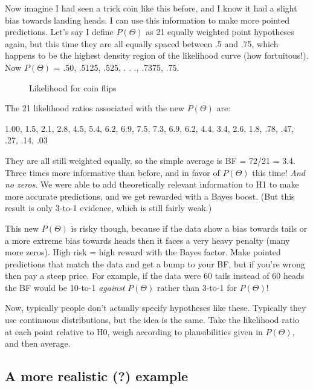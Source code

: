 Now imagine I had seen a trick coin like this before, and I know it had a slight bias towards landing heads. I can use this information to make more pointed predictions. Let's say I define $P(\Theta)$ as 21 equally weighted point hypotheses again, but this time they are all equally spaced between .5 and .75, which happens to be the highest density region of the likelihood curve (how fortuitous!). Now $P(\Theta)$ = {.50, .5125, .525, . . ., .7375, .75}.

\begin{figure}[h]
    \centering
    \caption{Likelihood for coin flips}
    \label{fig:p05c03-snip15}
\end{figure}


The 21 likelihood ratios associated with the new $P(\Theta)$ are:

{1.00, 1.5, 2.1, 2.8, 4.5, 5.4, 6.2, 6.9, 7.5, 7.3, 6.9, 6.2, 4.4, 3.4, 2.6, 1.8, .78, .47, .27, .14, .03}

They are all still weighted equally, so the simple average is BF = 72/21 = 3.4. Three times more informative than before, and in favor of $P(\Theta)$ this time! \textit{And no zeros}. We were able to add theoretically relevant information to H1 to make more accurate predictions, and we get rewarded with a Bayes boost. (But this result is only 3-to-1 evidence, which is still fairly weak.)

This new $P(\Theta)$ is risky though, because if the data show a bias towards tails or a more extreme bias towards heads then it faces a very heavy penalty (many more zeros). High risk = high reward with the Bayes factor. Make pointed predictions that match the data and get a bump to your BF, but if you're wrong then pay a steep price. For example, if the data were 60 tails instead of 60 heads the BF would be 10-to-1 \textit{against} $P(\Theta)$ rather than 3-to-1 for $P(\Theta)$!

Now, typically people don't actually specify hypotheses like these. Typically they use continuous distributions, but the idea is the same. Take the likelihood ratio at each point relative to H0, weigh according to plausibilities given in $P(\Theta)$, and then average.

\subsection{A more realistic (?) example}

